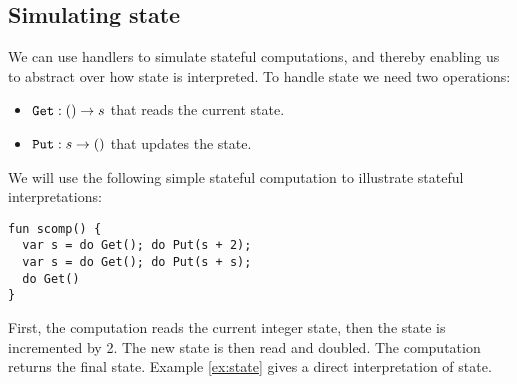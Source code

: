 \subsection{Simulating state}\label{sec:state}
We can use handlers to simulate stateful computations, and thereby enabling us to abstract over how state is interpreted. To handle state we need two operations:
\begin{itemize}
  \item $\texttt{Get}:() \to s$ that reads the current state.
  \item $\texttt{Put}:s \to ()$ that updates the state.
\end{itemize}
We will use the following simple stateful computation to illustrate stateful interpretations:
\begin{lstlisting}[style=links]
fun scomp() {
  var s = do Get(); do Put(s + 2);
  var s = do Get(); do Put(s + s);
  do Get()
}
\end{lstlisting}
First, the computation reads the current integer state, then the state is incremented by 2. The new state is then read and doubled. The computation returns the final state. Example \ref{ex:state} gives a direct interpretation of state.
